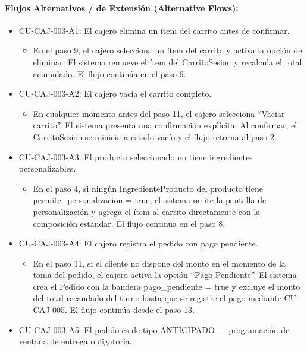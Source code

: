 \paragraph{Flujos Alternativos / de Extensión (Alternative Flows):}
\begin{itemize}
    \item CU-CAJ-003-A1: El cajero elimina un ítem del carrito antes de confirmar.
    \begin{itemize}
        \item En el paso 9, el cajero selecciona un ítem del carrito y activa la opción de eliminar. El sistema remueve el ítem del CarritoSesion y recalcula el total acumulado. El flujo continúa en el paso 9.
    \end{itemize}
    \item CU-CAJ-003-A2: El cajero vacía el carrito completo.
    \begin{itemize}
        \item En cualquier momento antes del paso 11, el cajero selecciona ``Vaciar carrito''. El sistema presenta una confirmación explícita. Al confirmar, el CarritoSesion se reinicia a estado vacío y el flujo retorna al paso 2.
    \end{itemize}
    \item CU-CAJ-003-A3: El producto seleccionado no tiene ingredientes personalizables.
    \begin{itemize}
        \item En el paso 4, si ningún IngredienteProducto del producto tiene permite\_personalizacion = true, el sistema omite la pantalla de personalización y agrega el ítem al carrito directamente con la composición estándar. El flujo continúa en el paso 8.
    \end{itemize}
    \item CU-CAJ-003-A4: El cajero registra el pedido con pago pendiente.
    \begin{itemize}
        \item En el paso 11, si el cliente no dispone del monto en el momento de la toma del pedido, el cajero activa la opción ``Pago Pendiente''. El sistema crea el Pedido con la bandera pago\_pendiente = true y excluye el monto del total recaudado del turno hasta que se registre el pago mediante CU-CAJ-005. El flujo continúa desde el paso 13.
    \end{itemize}
    \item CU-CAJ-003-A5: El pedido es de tipo ANTICIPADO --- programación de ventana de entrega obligatoria.
    \begin{itemize}

\end{itemize}
\end{itemize}

